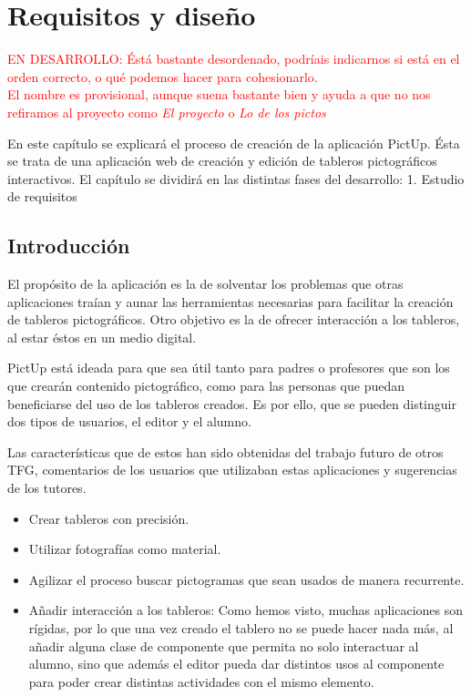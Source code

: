 \chapter{Requisitos y diseño}
\label{cap:introduccion}


\textcolor{red}{EN DESARROLLO: Éstá bastante desordenado, podríais indicarnos si está en el orden correcto, o qué podemos hacer para cohesionarlo. \\ El nombre es provisional, aunque suena bastante bien y ayuda a que no nos refiramos al proyecto como \textit{El proyecto} o \textit{Lo de los pictos}}



\begin{resumen}

	
	
	En este capítulo se explicará el proceso de creación de la aplicación PictUp. Ésta se trata de una aplicación web de creación y edición de tableros pictográficos interactivos. El capítulo se dividirá en las distintas fases del desarrollo: 1. Estudio de requisitos 
	
\end{resumen}

\label{cap1:sec:Motivacion}


\section{Introducción}

El propósito de la aplicación es la de solventar los problemas que otras aplicaciones traían y aunar las herramientas necesarias para facilitar la creación de tableros pictográficos. Otro objetivo es la de ofrecer interacción a los tableros, al estar éstos en un medio digital. 

PictUp está ideada para que sea útil tanto para padres o profesores que son los que crearán contenido pictográfico, como para las personas que puedan beneficiarse del uso de los tableros creados. Es por ello, que se pueden distinguir dos tipos de usuarios, el editor y el alumno. 

Las características que de estos han sido obtenidas del trabajo futuro de otros TFG, comentarios de los usuarios que utilizaban estas aplicaciones y sugerencias de los tutores.
\begin{itemize}
	\item Crear tableros con precisión.
	\item Utilizar fotografías como material.
	\item Agilizar el proceso buscar pictogramas que sean usados de manera recurrente.
	\item Añadir interacción a los tableros: Como hemos visto, muchas aplicaciones son rígidas, por lo que una vez creado el tablero no se puede hacer nada más, al añadir alguna clase de componente que permita no solo interactuar al alumno, sino que además el editor pueda dar distintos usos al componente para poder crear distintas actividades con el mismo elemento.
\end{itemize}






